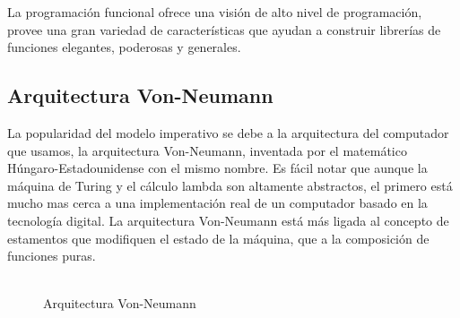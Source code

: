 La programación funcional ofrece una visión de alto nivel de programación, provee una gran variedad de características que ayudan a construir librerías de funciones elegantes, poderosas y generales.\cite{Thompson2011}

	\subsection{Arquitectura Von-Neumann}
	La popularidad del modelo imperativo se debe a la arquitectura del computador que usamos, la arquitectura Von-Neumann, inventada por el matemático Húngaro-Estadounidense con el mismo nombre. Es fácil notar que aunque la máquina de Turing y el cálculo lambda son altamente abstractos, el primero está mucho mas cerca a una implementación real de un computador basado en la tecnología digital. La arquitectura Von-Neumann está más ligada al concepto de estamentos que modifiquen el estado de la máquina, que a la composición de funciones puras.\\\\
	
	\begin{figure}[H]
		\centering
		
		\caption{Arquitectura Von-Neumann}
		\label{figram}
	\end{figure}
	
